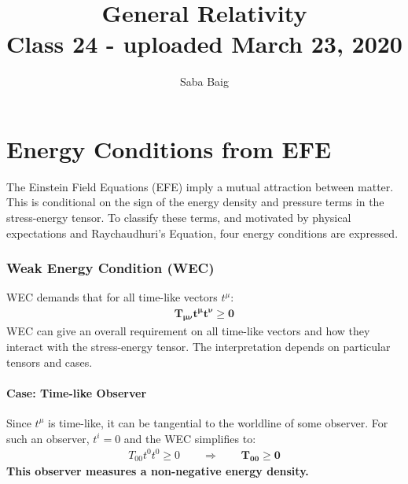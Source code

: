 \documentclass[10pt]{article}
\title{{\Huge General Relativity}\\{\Large{Class 24 - uploaded March 23, 2020}}} %
\author{Saba Baig}
\begin{document}
    \maketitle
    \flushbottom
    \newpage
    \pagestyle{fancynotes}
    \part{Energy Conditions from EFE}
	    The Einstein Field Equations (EFE) imply a mutual attraction between matter. This is conditional on the sign of the energy density and pressure terms in the stress-energy tensor. To classify these terms, and motivated by physical expectations and Raychaudhuri's Equation, four energy conditions are expressed. 
	
            \section{Weak Energy Condition (WEC)}\label{sec:WEC}
                WEC demands that for all time-like vectors $t^\mu$:
                \begin{align}\label{eq:WEC}
                    \boldsymbol{T_{\mu\nu}t^{\mu}t^{\nu} \geq 0} 
                \end{align} 
                WEC can give an overall requirement on all time-like vectors and how they interact with the stress-energy tensor. The interpretation depends on particular tensors and cases.
            \subsection{Case: Time-like Observer}
        	    Since $t^\mu$ is time-like, it can be tangential to the worldline of some observer. For such an observer, $t^{i}=0$ and the WEC simplifies to:
        	    \begin{align}
        	        T_{00}t^{0}t^{0} \geq 0 \qquad \Rightarrow \qquad \boldsymbol{T_{00} \geq 0}
        	    \end{align}
        	    \textbf{This observer measures a non-negative energy density.}
\end{document}
